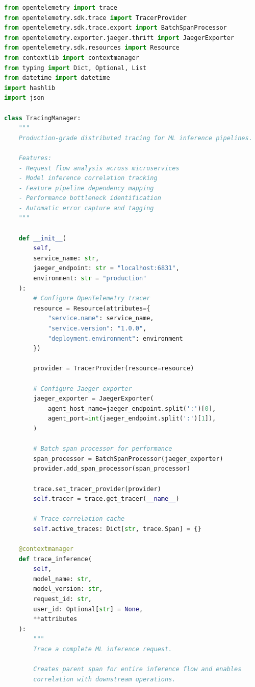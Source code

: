 \begin{lstlisting}[language=Python, caption={Production TracingManager with OpenTelemetry}]
from opentelemetry import trace
from opentelemetry.sdk.trace import TracerProvider
from opentelemetry.sdk.trace.export import BatchSpanProcessor
from opentelemetry.exporter.jaeger.thrift import JaegerExporter
from opentelemetry.sdk.resources import Resource
from contextlib import contextmanager
from typing import Dict, Optional, List
from datetime import datetime
import hashlib
import json

class TracingManager:
    """
    Production-grade distributed tracing for ML inference pipelines.

    Features:
    - Request flow analysis across microservices
    - Model inference correlation tracking
    - Feature pipeline dependency mapping
    - Performance bottleneck identification
    - Automatic error capture and tagging
    """

    def __init__(
        self,
        service_name: str,
        jaeger_endpoint: str = "localhost:6831",
        environment: str = "production"
    ):
        # Configure OpenTelemetry tracer
        resource = Resource(attributes={
            "service.name": service_name,
            "service.version": "1.0.0",
            "deployment.environment": environment
        })

        provider = TracerProvider(resource=resource)

        # Configure Jaeger exporter
        jaeger_exporter = JaegerExporter(
            agent_host_name=jaeger_endpoint.split(':')[0],
            agent_port=int(jaeger_endpoint.split(':')[1]),
        )

        # Batch span processor for performance
        span_processor = BatchSpanProcessor(jaeger_exporter)
        provider.add_span_processor(span_processor)

        trace.set_tracer_provider(provider)
        self.tracer = trace.get_tracer(__name__)

        # Trace correlation cache
        self.active_traces: Dict[str, trace.Span] = {}

    @contextmanager
    def trace_inference(
        self,
        model_name: str,
        model_version: str,
        request_id: str,
        user_id: Optional[str] = None,
        **attributes
    ):
        """
        Trace a complete ML inference request.

        Creates parent span for entire inference flow and enables
        correlation with downstream operations.


\end{lstlisting}
